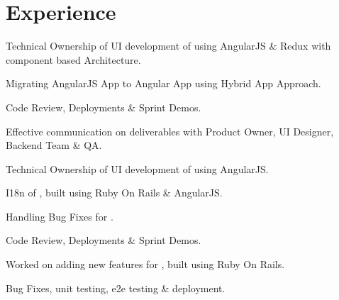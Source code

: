 \documentclass[]{my-resume-openfont}
\begin{document}
\hfill
\begin{minipage}[t]{0.66\textwidth}


\section{Experience}

\vspace{\topsep} %
\begin{tightemize}
\item{ Technical Ownership of UI development of  using AngularJS \& Redux with component based Architecture.}
\item Migrating AngularJS App to Angular App using Hybrid App Approach.
\item Code Review, Deployments \& Sprint Demos.
\item Effective communication on deliverables with Product Owner, UI Designer, Backend Team \& QA.
\end{tightemize}
\sectionsep

\begin{tightemize}
\item Technical Ownership of UI development of  using AngularJS.
\item I18n of , built using Ruby On Rails \& AngularJS.
\item Handling Bug Fixes for .
\item Code Review, Deployments \& Sprint Demos.
\end{tightemize}
\sectionsep

\begin{tightemize}
\item Worked on adding new features for , built using Ruby On Rails.
\item Bug Fixes, unit testing, e2e testing \& deployment.
\end{tightemize}
\sectionsep


\end{minipage}
\end{document}
